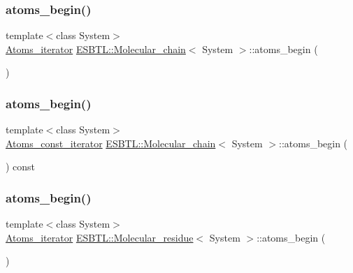 \subsubsection{\texorpdfstring{atoms\+\_\+begin()}{atoms\_begin()}\hspace{0.1cm}{\footnotesize\ttfamily [5/8]}}
{\footnotesize\ttfamily template$<$class System$>$ \\
\hyperlink{group__grp__iters_gab2ee52ce4f9b656648669214cc44a4ea}{Atoms\+\_\+iterator} \hyperlink{classESBTL_1_1Molecular__chain}{E\+S\+B\+T\+L\+::\+Molecular\+\_\+chain}$<$ System $>$\+::atoms\+\_\+begin (\begin{DoxyParamCaption}{ }\end{DoxyParamCaption})\hspace{0.3cm}{\ttfamily [inline]}}

\mbox{\label{group__grp__iters_gac6ba7621f15096a4633db8b112fd05fe}} 
\subsubsection{\texorpdfstring{atoms\+\_\+begin()}{atoms\_begin()}\hspace{0.1cm}{\footnotesize\ttfamily [6/8]}}
{\footnotesize\ttfamily template$<$class System$>$ \\
\hyperlink{group__grp__iters_gad872d386b268126c9bb2a2127a6a7254}{Atoms\+\_\+const\+\_\+iterator} \hyperlink{classESBTL_1_1Molecular__chain}{E\+S\+B\+T\+L\+::\+Molecular\+\_\+chain}$<$ System $>$\+::atoms\+\_\+begin (\begin{DoxyParamCaption}{ }\end{DoxyParamCaption}) const\hspace{0.3cm}{\ttfamily [inline]}}

\mbox{\label{group__grp__iters_ga1a03ace7902e971ae8a0d82eddf237c6}} 
\subsubsection{\texorpdfstring{atoms\+\_\+begin()}{atoms\_begin()}\hspace{0.1cm}{\footnotesize\ttfamily [7/8]}}
{\footnotesize\ttfamily template$<$class System$>$ \\
\hyperlink{group__grp__iters_ga4f220ea2d647f555b579a7ab2831baa7}{Atoms\+\_\+iterator} \hyperlink{classESBTL_1_1Molecular__residue}{E\+S\+B\+T\+L\+::\+Molecular\+\_\+residue}$<$ System $>$\+::atoms\+\_\+begin (\begin{DoxyParamCaption}{ }\end{DoxyParamCaption})\hspace{0.3cm}{\ttfamily [inline]}}

